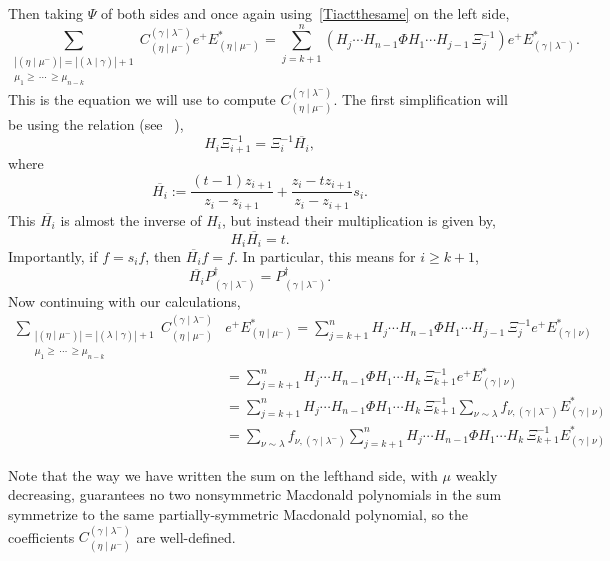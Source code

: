 \documentclass[ALCO]{cedram}
\newcommand{\ep}{e^+}
\newcommand{\Estar}[1]{E^*_{#1}}
\newcommand{\PB}[1]{P_{#1}^\dagger}
\newcommand{\nudom}{{( \lambda \mid \gamma )}}
\newcommand{\lambdagamma}{{\nudom}}
\newcommand{\gammalambdamin}{{(\gamma \mid \lambda^-)}}
\newcommand{\gammanu}{{(\gamma \mid \nu)}}
\newcommand{\etamu}{{(\eta \mid \mu^-)}}
\newcommand{\fnu}{f_{\nu, \gammalambdamin}}
\begin{document}
Then taking $\Psi$ of both sides and once again using~\eqref{Tiactthesame} on the left side,
\begin{equation}\label{bothsides}  \sum_{\substack{|\etamu| = |\lambdagamma| + 1 \\ \mu_1 \geq \, \dotsm \, \geq \mu_{n-k}}}  C^{\gammalambdamin}_{\etamu} e^+ \Estar{\etamu} = \sum_{j=k+1}^n \left( H_j \dotsm H_{n-1} \Phi H_1 \dotsm H_{j-1} \, \Xi_j^{-1} \right) \ep \Estar{\gammalambdamin}.\end{equation}
This is the equation we will use to compute $C_{\etamu}^{\gammalambdamin}$. The first simplification will be using the relation (see ~\cite{MR1456318}),
\[ H_i \Xi_{i+1}^{-1} = \Xi^{-1}_i \overline{H_i},\]
where 
\[\overline{H_i} := \frac{(t-1)z_{i+1}}{z_i-z_{i+1}} + \frac{z_i-tz_{i+1}}{z_i-z_{i+1}} s_i.\]
This $\overline{H_i}$ is almost the inverse of $H_i$, but instead their multiplication is given by,
\[H_i \overline{H_i} = t.\] Importantly, if $f=s_i f$, then $\overline{H_i} f = f$. In particular, this means for $i\geq k+1$,
\[ \overline{H_i} \PB{\gammalambdamin} = \PB{\gammalambdamin}.\]
Now continuing with our calculations,
\begin{align*}
   \sum_{\substack{|\etamu| = |\lambdagamma| + 1 \\ \mu_1 \geq \, \dotsm \, \geq \mu_{n-k}}}  C^{\gammalambdamin}_{\etamu} &e^+ \Estar{\etamu}  =  \sum_{j=k+1}^n  H_j \dotsm H_{n-1} \Phi H_1 \dotsm H_{j-1} \, \Xi_j^{-1} \ep \Estar{\gammanu}\\  
    &=  \sum_{j=k+1}^n  H_j \dotsm H_{n-1} \Phi H_1 \dotsm H_{k} \, \Xi_{k+1}^{-1}  \ep \Estar{\gammanu}\\
    &= \sum_{j=k+1}^n H_j \dotsm H_{n-1} \Phi H_1 \dotsm H_{k} \, \Xi_{k+1}^{-1} \sum_{\nu \sim \lambda} \fnu \Estar{\gammanu} \\
    &=  \sum_{\nu \sim \lambda} \fnu  \sum_{j=k+1}^n H_j \dotsm H_{n-1} \Phi H_1 \dotsm H_{k} \, \Xi_{k+1}^{-1} \Estar{\gammanu}
\end{align*}



Note that the way we have written the sum on the lefthand side, with $\mu$ weakly decreasing, guarantees no two nonsymmetric Macdonald polynomials in the sum symmetrize to the same partially-symmetric Macdonald polynomial, so the coefficients $C_{\etamu}^{\gammalambdamin}$ are well-defined.
\end{document}

